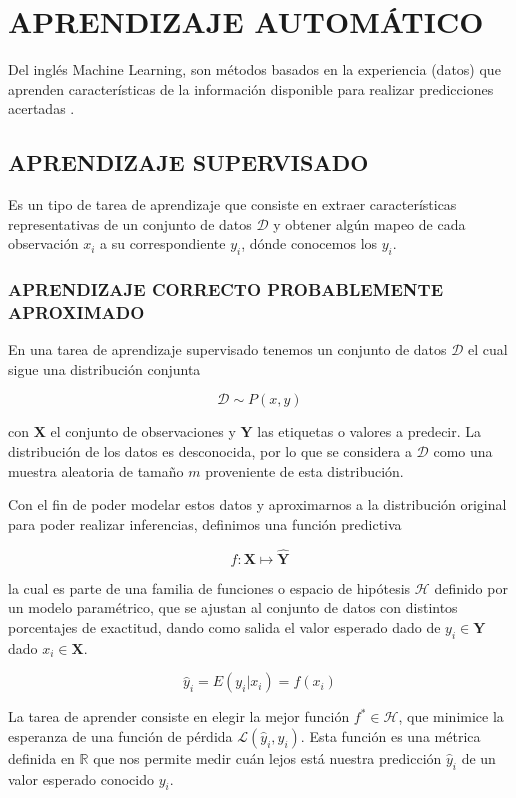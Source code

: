 \section{APRENDIZAJE AUTOMÁTICO}
    Del inglés Machine Learning, son métodos basados en la experiencia (datos) que aprenden características de la información disponible para realizar predicciones acertadas \citep{10.5555/3360093}.
    \subsection{APRENDIZAJE SUPERVISADO}
        Es un tipo de tarea de aprendizaje que consiste en extraer características representativas de un conjunto de datos $\mathcal{D}$ y obtener algún mapeo de cada observación $x_i$ a su correspondiente $y_i$, dónde conocemos los $y_i$.
    
        \subsubsection{APRENDIZAJE CORRECTO PROBABLEMENTE APROXIMADO}
        En una tarea de aprendizaje supervisado tenemos un conjunto de datos $\mathcal{D}$ el cual sigue una distribución conjunta
        
        $$\mathcal{D} \sim P(x, y)$$
        
        \noindent con $\mathbf{X}$ el conjunto de observaciones y $\mathbf{Y}$ las etiquetas o valores a predecir. La distribución de los datos es desconocida, por lo que se considera a $\mathcal{D}$ como una muestra aleatoria de tamaño $m$ proveniente de esta distribución.
        
        Con el fin de poder modelar estos datos y aproximarnos a la distribución original para poder realizar inferencias, definimos una función predictiva
        
        $$f: \mathbf{X} \mapsto \mathbf{\hat{Y}}$$
        
        \noindent la cual es parte de una familia de funciones o espacio de hipótesis $\mathcal{H}$ definido por un modelo paramétrico, que se ajustan al conjunto de datos con distintos porcentajes de exactitud, dando como salida el valor esperado dado de $y_i \in \mathbf{Y}$ dado $x_i \in \mathbf{X}$.
        
        $$\hat{y}_i = E(y_i|x_i) = f(x_i)$$
        
        La tarea de aprender consiste en elegir la mejor función $f^* \in \mathcal{H}$, que minimice la esperanza de una función de pérdida $\mathcal{L}(\hat{y}_i, y_i)$. Esta función es una métrica definida en $\mathbb{R}$ que nos permite medir cuán lejos está nuestra predicción $\hat{y}_i$ de un valor esperado conocido $y_i$.
        
